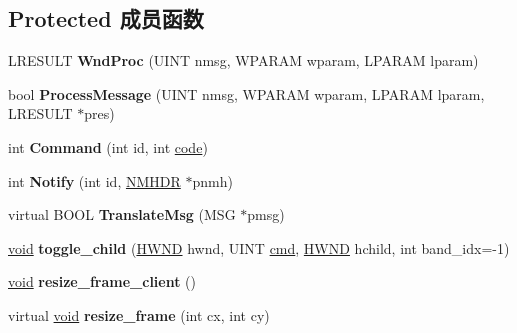 \subsection*{Protected 成员函数}
\begin{DoxyCompactItemize}
\item 
\mbox{\label{struct_main_frame_base_aaa1e3fd95696d20618be22b9bb431ca5}} 
L\+R\+E\+S\+U\+LT {\bfseries Wnd\+Proc} (U\+I\+NT nmsg, W\+P\+A\+R\+AM wparam, L\+P\+A\+R\+AM lparam)
\item 
\mbox{\label{struct_main_frame_base_ab08b1dc08840debc1f659da6c19e9b7f}} 
bool {\bfseries Process\+Message} (U\+I\+NT nmsg, W\+P\+A\+R\+AM wparam, L\+P\+A\+R\+AM lparam, L\+R\+E\+S\+U\+LT $\ast$pres)
\item 
\mbox{\label{struct_main_frame_base_a49d07dba72f36e117aa60bf15469ed62}} 
int {\bfseries Command} (int id, int \hyperlink{structcode}{code})
\item 
\mbox{\label{struct_main_frame_base_a87585f897c2ab2622438d196575a5708}} 
int {\bfseries Notify} (int id, \hyperlink{structtag_n_m_h_d_r}{N\+M\+H\+DR} $\ast$pnmh)
\item 
\mbox{\label{struct_main_frame_base_a28ba53915fe8b305442528edcca25812}} 
virtual B\+O\+OL {\bfseries Translate\+Msg} (M\+SG $\ast$pmsg)
\item 
\mbox{\label{struct_main_frame_base_a908f6bcc930a084b1ac5a937e1bbb019}} 
\hyperlink{interfacevoid}{void} {\bfseries toggle\+\_\+child} (\hyperlink{interfacevoid}{H\+W\+ND} hwnd, U\+I\+NT \hyperlink{structcmd}{cmd}, \hyperlink{interfacevoid}{H\+W\+ND} hchild, int band\+\_\+idx=-\/1)
\item 
\mbox{\label{struct_main_frame_base_ac05830ea8f5e1b2a330fd9cac82d6df4}} 
\hyperlink{interfacevoid}{void} {\bfseries resize\+\_\+frame\+\_\+client} ()
\item 
\mbox{\label{struct_main_frame_base_a54dd3cc76a9442800920b65f8587e6de}} 
virtual \hyperlink{interfacevoid}{void} {\bfseries resize\+\_\+frame} (int cx, int cy)

\end{DoxyCompactItemize}
